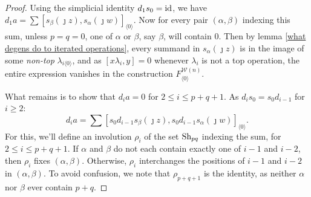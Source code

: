 \documentclass[11pt]{amsart}
\theoremstyle{plain}
\theoremstyle{definition}
\newcommand{\calW}{\mathcal{W}}
\theoremstyle{plain}
\newcommand{\Shuffles}[2]{\textup{Sh}_{#1#2}}
\newcommand{\Id}{\textup{id}}
\begin{document}
\begin{Koszul complexes}
\begin{proof}
Using the simplicial identity $d_1s_0=\Id$, we have $d_{1}a=\sum [s_\beta(\jmath z), s_\alpha(\jmath w)]_{\langle 0\rangle}$. Now for every pair $(\alpha,\beta)$ indexing this sum, unless $p=q=0$, one of $\alpha$ or $\beta$, say $\beta$, will contain $0$. Then by lemma \ref{what degens do to iterated operations}, every summand in $s_{\alpha}(\jmath z)$ is in the image of some \emph{non-top} $\lambda_{i\langle 0\rangle}$, and as $[x\lambda_i,y]=0$ whenever $\lambda_i$ is not a top operation, the entire expression vanishes in the construction $F^{\calW(n)}_{\langle 0\rangle}$.

What remains is to show that $d_{i}a=0$ for $2\leq i\leq p+q+1$. As $d_is_0=s_0d_{i-1}$ for $i\geq2$:
\[d_{i}a=\sum [s_{0}d_{i-1}s_\beta(\jmath z), s_{0}d_{i-1}s_\alpha(\jmath w)]_{\langle 0\rangle}.\]
For this, we'll define an involution $\rho_i$ of the set $\Shuffles{p}{q}$ indexing the sum, for $2\leq i\leq p+q+1$.
If $\alpha$ and $\beta$ do not each contain exactly one of $i-1$ and $i-2$, then $\rho_i$ fixes $(\alpha,\beta)$. Otherwise, $\rho_i$ interchanges the positions of $i-1$ and $i-2$ in $(\alpha,\beta)$. To avoid confusion, we note that $\rho_{p+q+1}$ is the identity, as neither $\alpha$ nor $\beta$ ever contain $p+q$.


\end{proof}
\end{Koszul complexes}
\end{document}
